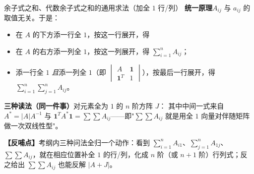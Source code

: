\begin{fdeep}{余子式之和、代数余子式之和的通用求法（加全 $1$ 行/列）}
\textbf{统一原理}\quad $A_{ij}$ 与 $a_{ij}$ 的取值无关。于是：
\begin{itemize}
\item 在 $A$ 的下方添一行全 $1$，按这一行展开，得
\item 在 $A$ 的右方添一列全 $1$，按这一列展开，得 $\sum\limits_{i=1}^{n}A_{ij}$；
\item 添一行全 $1$ \emph{且}添一列全 $1$（即 $\begin{vmatrix} A & \mathbf{1}\\ \mathbf{1}^{T} & 1\end{vmatrix}$），按最后一行展开，得 $\sum\limits_{i=1}^{n}\sum\limits_{j=1}^{n}A_{ij}$。
\end{itemize}

\textbf{三种读法（同一件事）}\quad 对元素全为 $1$ 的 $n$ 阶方阵 $J$：
其中中间一式来自 $A^{*}=|A|A^{-1}$ 与 $\mathbf{1}^{T}A^{*}\mathbf{1}=\sum\sum A_{ij}$——即"$\sum\sum A_{ij}$ 就是用全 $1$ 向量对伴随矩阵做一次双线性型"。

\textbf{【反哺点】}考纲内三种问法全归一个动作：看到 $\sum\limits_{i=1}^{n}A_{i1}$、$\sum\limits_{j=1}^{n}A_{1j}$、$\sum\sum A_{ij}$，就在相应位置补全 $1$ 的行/列，化成 $n$ 阶（或 $n+1$ 阶）行列式；反之给出 $\sum\sum A_{ij}$ 也能反解 $|A+J|$。
\end{fdeep}


